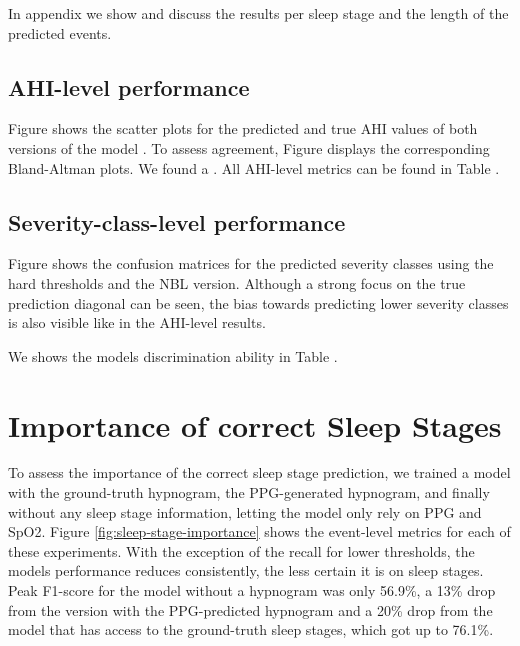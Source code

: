 In appendix  we show and discuss the results per sleep stage and the length of the predicted events.

\subsection*{AHI-level performance }

Figure  shows the scatter plots for the predicted and true AHI values of both versions of the model . To assess agreement, Figure  displays the corresponding Bland-Altman plots. We found a . All AHI-level metrics can be found in Table .

\subsection*{Severity-class-level performance}

Figure  shows the confusion matrices for the predicted severity classes using the hard thresholds and the NBL version. Although a strong focus on the true prediction diagonal can be seen, the bias towards predicting lower severity classes is also visible like in the AHI-level results.

We shows the models discrimination ability in Table . 

\section{Importance of correct Sleep Stages}

To assess the importance of the correct sleep stage prediction, we trained a model with the ground-truth hypnogram, the PPG-generated hypnogram, and finally without any sleep stage information, letting the model only rely on PPG and SpO2. Figure \ref{fig:sleep-stage-importance} shows the event-level metrics for each of these experiments. With the exception of the recall for lower thresholds, the models performance reduces consistently, the less certain it is on sleep stages. Peak F1-score for the model without a hypnogram was only 56.9\%, a 13\% drop from the version with the PPG-predicted hypnogram and a 20\% drop from the model that has access to the ground-truth sleep stages, which got up to 76.1\%.

